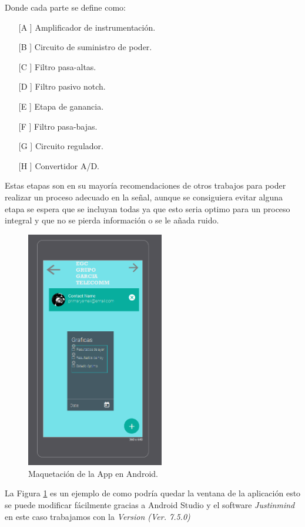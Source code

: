 Donde cada parte se define como:
\begin{itemize}
\item[[A]] Amplificador de instrumentación.
\item[[B]] Circuito de suministro de poder.
\item[[C]] Filtro pasa-altas.
\item[[D]] Filtro pasivo notch.
\item[[E]] Etapa de ganancia.
\item[[F]] Filtro pasa-bajas.
\item[[G]] Circuito regulador.
\item[[H]] Convertidor A/D.
\end{itemize}
Estas etapas son en su mayoría recomendaciones de otros trabajos para poder realizar un proceso adecuado en la señal, aunque se consiguiera evitar alguna etapa se espera que se incluyan todas ya que esto seria optimo para un proceso integral y que no se pierda información o se le añada ruido.
\begin{figure}[H]
   	\centering
		\includegraphics[width=6cm]{imag/app.PNG}
		\caption{Maquetación de la App en Android.}
		\label{app}
\end{figure}
La Figura \ref{app} es un ejemplo de como podría quedar la ventana de la aplicación esto se puede modificar fácilmente gracias a Android Studio y el software \textit{Justinmind} en este caso trabajamos con la \textit{Version (Ver. 7.5.0)}\newpage

